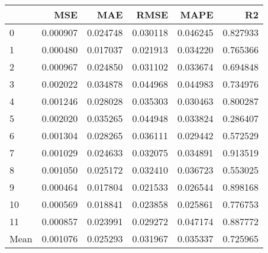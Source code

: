 \begin{tabular}{lrrrrr}
\toprule
 & MSE & MAE & RMSE & MAPE & R2 \\
\midrule
0 & 0.000907 & 0.024748 & 0.030118 & 0.046245 & 0.827933 \\
1 & 0.000480 & 0.017037 & 0.021913 & 0.034220 & 0.765366 \\
2 & 0.000967 & 0.024850 & 0.031102 & 0.033674 & 0.694848 \\
3 & 0.002022 & 0.034878 & 0.044968 & 0.044983 & 0.734976 \\
4 & 0.001246 & 0.028028 & 0.035303 & 0.030463 & 0.800287 \\
5 & 0.002020 & 0.035265 & 0.044948 & 0.033824 & 0.286407 \\
6 & 0.001304 & 0.028265 & 0.036111 & 0.029442 & 0.572529 \\
7 & 0.001029 & 0.024633 & 0.032075 & 0.034891 & 0.913519 \\
8 & 0.001050 & 0.025172 & 0.032410 & 0.036723 & 0.553025 \\
9 & 0.000464 & 0.017804 & 0.021533 & 0.026544 & 0.898168 \\
10 & 0.000569 & 0.018841 & 0.023858 & 0.025861 & 0.776753 \\
11 & 0.000857 & 0.023991 & 0.029272 & 0.047174 & 0.887772 \\
Mean & 0.001076 & 0.025293 & 0.031967 & 0.035337 & 0.725965 \\
\bottomrule
\end{tabular}
